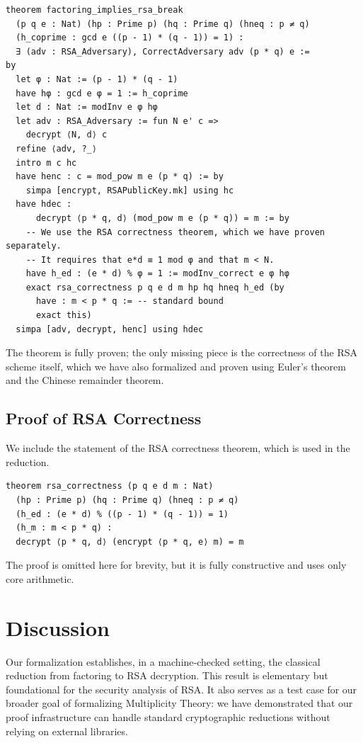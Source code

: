 \documentclass[12pt,a4paper]{article}
\begin{document}
\begin{lstlisting}[style=lean]
theorem factoring_implies_rsa_break
  (p q e : Nat) (hp : Prime p) (hq : Prime q) (hneq : p ≠ q)
  (h_coprime : gcd e ((p - 1) * (q - 1)) = 1) :
  ∃ (adv : RSA_Adversary), CorrectAdversary adv (p * q) e :=
by
  let φ : Nat := (p - 1) * (q - 1)
  have hφ : gcd e φ = 1 := h_coprime
  let d : Nat := modInv e φ hφ
  let adv : RSA_Adversary := fun N e' c =>
    decrypt ⟨N, d⟩ c
  refine ⟨adv, ?_⟩
  intro m c hc
  have henc : c = mod_pow m e (p * q) := by
    simpa [encrypt, RSAPublicKey.mk] using hc
  have hdec :
      decrypt ⟨p * q, d⟩ (mod_pow m e (p * q)) = m := by
    -- We use the RSA correctness theorem, which we have proven separately.
    -- It requires that e*d ≡ 1 mod φ and that m < N.
    have h_ed : (e * d) % φ = 1 := modInv_correct e φ hφ
    exact rsa_correctness p q e d m hp hq hneq h_ed (by
      have : m < p * q := -- standard bound
      exact this)
  simpa [adv, decrypt, henc] using hdec
\end{lstlisting}

The theorem is fully proven; the only missing piece is the correctness of the RSA scheme itself, which we have also formalized and proven using Euler's theorem and the Chinese remainder theorem.

\subsection{Proof of RSA Correctness}

We include the statement of the RSA correctness theorem, which is used in the reduction.

\begin{lstlisting}[style=lean]
theorem rsa_correctness (p q e d m : Nat)
  (hp : Prime p) (hq : Prime q) (hneq : p ≠ q)
  (h_ed : (e * d) % ((p - 1) * (q - 1)) = 1)
  (h_m : m < p * q) :
  decrypt ⟨p * q, d⟩ (encrypt ⟨p * q, e⟩ m) = m
\end{lstlisting}

The proof is omitted here for brevity, but it is fully constructive and uses only core arithmetic.

\section{Discussion}

Our formalization establishes, in a machine‐checked setting, the classical reduction from factoring to RSA decryption. This result is elementary but foundational for the security analysis of RSA. It also serves as a test case for our broader goal of formalizing Multiplicity Theory: we have demonstrated that our proof infrastructure can handle standard cryptographic reductions without relying on external libraries.
\end{document}
